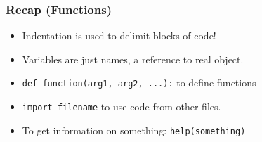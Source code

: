 
\begin{frame}[fragile]\frametitle{Recap (Functions)}
  \begin{itemize}
  \item Indentation is used to delimit blocks of code!
  \item Variables are just names, a reference to real object.
  \item \lstinline|def function(arg1, arg2, ...):| to define functions
  \item \lstinline|import filename| to use code from other files.
  \item To get information on something: \lstinline|help(something)|
  \end{itemize}
\end{frame}